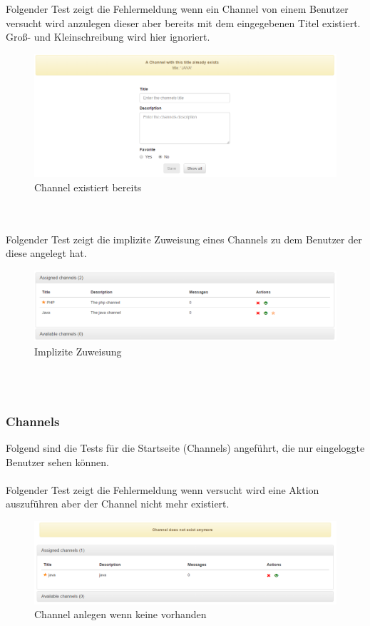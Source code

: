 \documentclass[11pt, a4paper, twoside]{article}   	%
\begin{document}
Folgender Test zeigt die Fehlermeldung wenn ein Channel von einem Benutzer versucht wird anzulegen dieser aber bereits mit dem eingegebenen Titel existiert. Groß- und Kleinschreibung wird hier ignoriert.
\begin{figure}[h]
	\centering
	\includegraphics[scale=0.5]{images/start_new_channel_fail.PNG}
	\caption
	{Channel existiert bereits}
\end{figure}\\\\

Folgender Test zeigt die implizite Zuweisung eines Channels zu dem Benutzer der diese angelegt hat.
\begin{figure}[h]
	\centering
	\includegraphics[scale=0.5]{images/start_channels_assigned_after_creation.PNG}
	\caption
	{Implizite Zuweisung}
\end{figure}\\\\
\newpage

\subsubsection{Channels}
Folgend sind die Tests für die Startseite (Channels) angeführt, die nur eingeloggte Benutzer sehen können.\\\\
Folgender Test zeigt die Fehlermeldung wenn versucht wird eine Aktion auszuführen aber der Channel nicht mehr existiert.\\
\begin{figure}[h]
	\centering
	\includegraphics[scale=0.5]{images/start_channels_action_fail.PNG}
	\caption
	{Channel anlegen wenn keine vorhanden}
\end{figure}\\\\
\end{document}

